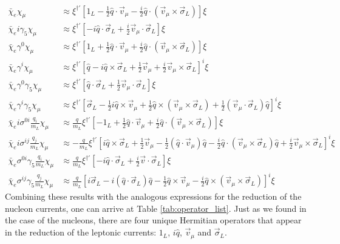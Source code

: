 \documentclass[12pt,letterpaper]{book}
\begin{document}
\begin{equation}
\begin{split}
\bar{\chi}_e\chi_{\mu}&\approx \xi^{\dag'}\left[1_L-\frac{1}{2}\hat{q}\cdot\vec{v}_{\mu}-\frac{i}{2}\hat{q}\cdot\left(\vec{v}_{\mu}\times\vec{\sigma}_L\right)\right]\xi\\
\bar{\chi}_ei\gamma_5\chi_{\mu}&\approx \xi^{\dag'}\left[-i\hat{q}\cdot\vec{\sigma}_L+\frac{i}{2}\vec{v}_{\mu}\cdot\vec{\sigma}_L\right]\xi\\
\bar{\chi}_e\gamma^0\chi_{\mu}&\approx \xi^{\dag'}\left[1_L+\frac{1}{2}\hat{q}\cdot\vec{v}_{\mu}+\frac{i}{2}\hat{q}\cdot\left(\vec{v}_{\mu}\times\vec{\sigma}_L\right)\right]\xi\\
\bar{\chi}_e\gamma^i\chi_{\mu}&\approx \xi^{\dag'}\left[\hat{q}-i\hat{q}\times\vec{\sigma}_L+\frac{1}{2}\vec{v}_{\mu}+\frac{i}{2}\vec{v}_{\mu}\times\vec{\sigma}_L\right]^i\xi\\
\bar{\chi}_e\gamma^0\gamma_5\chi_{\mu}&\approx \xi^{\dag'}\left[\hat{q}\cdot\vec{\sigma}_L+\frac{1}{2}\vec{v}_{\mu}\cdot\vec{\sigma}_L\right]\xi\\
\bar{\chi}_e\gamma^i\gamma_5\chi_{\mu}&\approx \xi^{\dag'}\left[\vec{\sigma}_L-\frac{1}{2}i\hat{q}\times\vec{v}_{\mu}+\frac{1}{2}\hat{q}\times\left(\vec{v}_{\mu}\times\vec{\sigma}_L\right)+\frac{1}{2}\left(\vec{v}_{\mu}\cdot\vec{\sigma}_L\right)\hat{q}\right]^i\xi\\
\bar{\chi}_ei\sigma^{0i}\frac{q_i}{m_L}\chi_{\mu}&\approx \frac{q}{m_L}\xi^{\dag'}\left[-1_L+\frac{1}{2}\hat{q}\cdot\vec{v}_{\mu}+\frac{i}{2}\hat{q}\cdot\left(\vec{v}_{\mu}\times\vec{\sigma}_L\right)\right]\xi\\
\bar{\chi}_ei\sigma^{ij}\frac{q_j}{m_L}\chi_{\mu}&\approx -\frac{q}{m_L}\xi^{\dag'}\left[i\hat{q}\times\vec{\sigma}_L+\frac{1}{2}\vec{v}_{\mu}-\frac{1}{2}\left(\hat{q}\cdot\vec{v}_{\mu}\right)\hat{q}-\frac{i}{2}\hat{q}\cdot\left(\vec{v}_{\mu}\times\vec{\sigma}_L\right)\hat{q}+\frac{i}{2}\vec{v}_{\mu}\times\vec{\sigma}_L\right]^i\xi\\
\bar{\chi}_e\sigma^{0i}\gamma_5\frac{q_i}{m_L}\chi_{\mu}&\approx \frac{q}{m_L}\xi^{\dag'}\left[-i\hat{q}\cdot\vec{\sigma}_L+\frac{i}{2}\vec{v}\cdot\vec{\sigma}_L\right]\xi\\
\bar{\chi}_e\sigma^{ij}\gamma_5\frac{q_j}{m_L}\chi_{\mu}&\approx \frac{q}{m_L}\left[i\vec{\sigma}_L-i\left(\hat{q}\cdot\vec{\sigma}_L\right)\hat{q}-\frac{1}{2}\hat{q}\times\vec{v}_{\mu}-\frac{i}{2}\hat{q}\times\left(\vec{v}_{\mu}\times\vec{\sigma}_L\right)\right]^i\xi
\end{split}
\end{equation}
Combining these results with the analogous expressions for the reduction of the nucleon currents, one can arrive at Table \ref{tab:operator_list}. Just as we found in the case of the nucleons, there are four unique Hermitian operators that appear in the reduction of the leptonic currents: $1_L$, $i\hat{q}$, $\vec{v}_{\mu}$ and $\vec{\sigma}_L$. 
\end{document}
